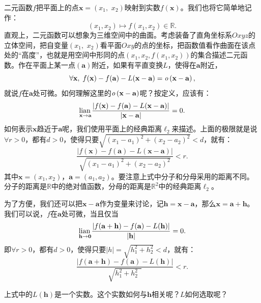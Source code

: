 \documentclass[12pt,UTF8,fontset=none]{ctexbook}
\begin{document}
二元函数$f$把平面上的点$\mathbf{x} = (x_1,\,\, x_2)$映射到实数$f(\mathbf{x})$。我们也将它简单地记作：
$$ (x_1, x_2) \mapsto f(x_1, x_2) \in \mathbb{R}.$$
直观上，二元函数可以想象为三维空间中的曲面。考虑装备了直角坐标系$Oxyz$的立体空间，把自变量$(x_1,\,\, x_2)$看平面$Oxy$的点的坐标，把函数值看作曲面在该点处的“高度”，也就是用空间中形同的点$(x_1, x_2, f(x_1, x_2))$的集合描述二元函数。作在平面上某一点$(\mathbf{a})$附近，如果有平直变换$L$，使得在$\mathbf{a}$附近，
$$ \forall \mathbf{x}, \; f(\mathbf{x}) - f(\mathbf{a}) - L(\mathbf{x} - \mathbf{a}) = \mathit{o}\left(\mathbf{x} - \mathbf{a}\right), $$
就说$f$在$\mathbf{a}$处可微。如何理解这里的$\mathit{o}\left(\mathbf{x} - \mathbf{a}\right)$呢？按定义，应该有：
$$ \underset{\mathbf{x} \to \mathbf{a}}{\operatorname{lian}\,} \frac{\left|f(\mathbf{x}) - f(\mathbf{a}) - L(\mathbf{x} - \mathbf{a})\right|}{\left|\mathbf{x} - \mathbf{a}\right|} = 0.$$
如何表示$\mathbf{x}$趋近于$\mathbf{a}$呢，我们使用平面上的经典距离$\ell_2$来描述。上面的极限就是说$\forall r > 0$，都有$d > 0$，使得只要$\sqrt{(x_1 - a_1)^2 + (x_2 - a_2)^2} < d$，就有：
$$ \frac{\left|f(\mathbf{x}) - f(\mathbf{a}) - L(\mathbf{x} - \mathbf{a})\right|}{\sqrt{(x_1 - a_1)^2 + (x_2 - a_2)^2}} < r. $$
其中$\mathbf{x} = (x_1, x_2)$，$\mathbf{a} = (a_1, a_2)$。要注意上式中分子和分母采用的距离不同。分子的距离是$\mathbb{R}$中的绝对值函数，分母的距离是$\mathbb{R}^2$中的经典距离$\ell_2$。

为了方便，我们还可以把$\mathbf{x} - \mathbf{a}$作为变量来讨论，记$\mathbf{h} = \mathbf{x} - \mathbf{a}$，那么$\mathbf{x} = \mathbf{a} + \mathbf{h}$。我们可以说，$f$在$\mathbf{a}$处可微，当且仅当
$$ \underset{\mathbf{h} \to \mathbf{0}}{\operatorname{lian}\,} \frac{\left|f(\mathbf{a} + \mathbf{h}) - f(\mathbf{a}) - L(\mathbf{h})\right|}{\left|\mathbf{h}\right|} = 0.$$
即$\forall r > 0$，都有$d > 0$，使得只要$|h| = \sqrt{h_1^2 + h_2^2} < d$，就有：
$$  \frac{\left|f(\mathbf{a} + \mathbf{h}) - f(\mathbf{a}) - L(\mathbf{h})\right|}{\sqrt{h_1^2 + h_2^2\phantom{0}}} < r.$$

上式中的$L(\mathbf{h})$是一个实数。这个实数如何与$\mathbf{h}$相关呢？$L$如何选取呢？
\end{document}
